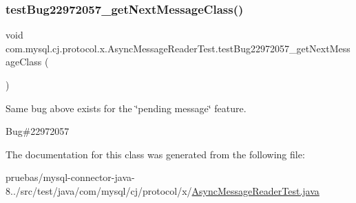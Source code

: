 \subsubsection{\texorpdfstring{test\+Bug22972057\+\_\+get\+Next\+Message\+Class()}{testBug22972057\_getNextMessageClass()}}
{\footnotesize\ttfamily void com.\+mysql.\+cj.\+protocol.\+x.\+Async\+Message\+Reader\+Test.\+test\+Bug22972057\+\_\+get\+Next\+Message\+Class (\begin{DoxyParamCaption}{ }\end{DoxyParamCaption})}

Same bug above exists for the \char`\"{}pending message\char`\"{} feature.

Bug\#22972057 

The documentation for this class was generated from the following file\+:\begin{DoxyCompactItemize}
\item 
pruebas/mysql-\/connector-\/java-\/8../src/test/java/com/mysql/cj/protocol/x/\mbox{\hyperlink{_async_message_reader_test_8java}{Async\+Message\+Reader\+Test.\+java}}\end{DoxyCompactItemize}
